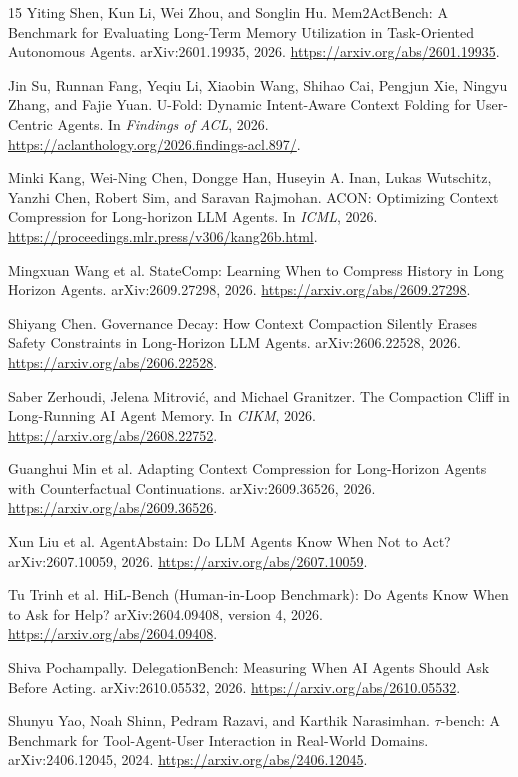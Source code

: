 \documentclass[10pt,twocolumn,letterpaper]{article}
\begin{document}
{\small
\begin{thebibliography}{15}
Yiting Shen, Kun Li, Wei Zhou, and Songlin Hu.
Mem2ActBench: A Benchmark for Evaluating Long-Term Memory Utilization in
Task-Oriented Autonomous Agents. arXiv:2601.19935, 2026.
\url{https://arxiv.org/abs/2601.19935}.

Jin Su, Runnan Fang, Yeqiu Li, Xiaobin Wang, Shihao Cai, Pengjun Xie,
Ningyu Zhang, and Fajie Yuan.
U-Fold: Dynamic Intent-Aware Context Folding for User-Centric Agents.
In \emph{Findings of ACL}, 2026.
\url{https://aclanthology.org/2026.findings-acl.897/}.

Minki Kang, Wei-Ning Chen, Dongge Han, Huseyin A. Inan, Lukas Wutschitz,
Yanzhi Chen, Robert Sim, and Saravan Rajmohan.
ACON: Optimizing Context Compression for Long-horizon LLM Agents.
In \emph{ICML}, 2026.
\url{https://proceedings.mlr.press/v306/kang26b.html}.

Mingxuan Wang et al.
StateComp: Learning When to Compress History in Long Horizon Agents.
arXiv:2609.27298, 2026.
\url{https://arxiv.org/abs/2609.27298}.

Shiyang Chen.
Governance Decay: How Context Compaction Silently Erases Safety Constraints
in Long-Horizon LLM Agents. arXiv:2606.22528, 2026.
\url{https://arxiv.org/abs/2606.22528}.

Saber Zerhoudi, Jelena Mitrovi\'c, and Michael Granitzer.
The Compaction Cliff in Long-Running AI Agent Memory.
In \emph{CIKM}, 2026.
\url{https://arxiv.org/abs/2608.22752}.

Guanghui Min et al.
Adapting Context Compression for Long-Horizon Agents with Counterfactual
Continuations. arXiv:2609.36526, 2026.
\url{https://arxiv.org/abs/2609.36526}.

Xun Liu et al.
AgentAbstain: Do LLM Agents Know When Not to Act?
arXiv:2607.10059, 2026.
\url{https://arxiv.org/abs/2607.10059}.

Tu Trinh et al.
HiL-Bench (Human-in-Loop Benchmark): Do Agents Know When to Ask for Help?
arXiv:2604.09408, version 4, 2026.
\url{https://arxiv.org/abs/2604.09408}.

Shiva Pochampally.
DelegationBench: Measuring When AI Agents Should Ask Before Acting.
arXiv:2610.05532, 2026.
\url{https://arxiv.org/abs/2610.05532}.

Shunyu Yao, Noah Shinn, Pedram Razavi, and Karthik Narasimhan.
$\tau$-bench: A Benchmark for Tool-Agent-User Interaction in Real-World Domains.
arXiv:2406.12045, 2024.
\url{https://arxiv.org/abs/2406.12045}.


\end{thebibliography}}
\end{document}
